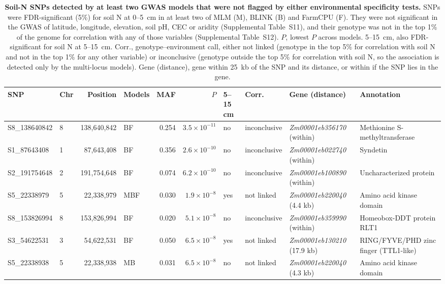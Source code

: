 \documentclass[namedate,unnumsec,webpdf,contemporary,large]{oup-authoring-template}
\begin{document}
\begin{table}[ht]
  \centering
  \scriptsize
  \caption{\textbf{Soil-N SNPs detected by at least two GWAS models that were not flagged by either environmental specificity tests.} SNPs were FDR-significant (5\%) for soil N at 0--5~cm in at least two of MLM (M), BLINK (B) and FarmCPU (F). They were not significant in the GWAS of latitude, longitude, elevation, soil pH, CEC or aridity (Supplemental Table~S11), and their genotype was not in the top 1\% of the genome for correlation with any of those variables (Supplemental Table~S12). $P$, lowest $P$ across models. 5--15~cm, also FDR-significant for soil N at 5--15~cm. Corr., genotype--environment call, either not linked (genotype in the top 5\% for correlation with soil N and not in the top 1\% for any other variable) or inconclusive (genotype outside the top 5\% for correlation with soil N, so the association is detected only by the multi-locus models). Gene (distance), gene within 25~kb of the SNP and its distance, or within if the SNP lies in the gene.}
  \label{tab:soilN_specific}
  \begin{tabular}{llrlrrllll}
  \hline
  SNP & Chr & Position & Models & MAF & $P$ & 5--15 cm & Corr. & Gene (distance) & Annotation \\
  \hline
  S8\_138640842 & 8 & 138,640,842 & BF  & 0.254 & $3.5\times10^{-11}$ & no  & inconclusive & \textit{Zm00001eb356170} (within) & Methionine S-methyltransferase \\
  S1\_87643408  & 1 &  87,643,408 & BF  & 0.356 & $2.6\times10^{-10}$ & no  & inconclusive & \textit{Zm00001eb022740} (within) & Syndetin \\
  S2\_191754648 & 2 & 191,754,648 & BF  & 0.074 & $6.2\times10^{-10}$ & no  & inconclusive & \textit{Zm00001eb100890} (within) & Uncharacterized protein \\
  S5\_22338979  & 5 &  22,338,979 & MBF & 0.030 & $1.9\times10^{-8}$  & yes & not linked   & \textit{Zm00001eb220040} (4.4 kb) & Amino acid kinase domain \\
  S8\_153826994 & 8 & 153,826,994 & BF  & 0.020 & $5.1\times10^{-8}$  & no  & inconclusive & \textit{Zm00001eb359990} (within) & Homeobox-DDT protein RLT1 \\
  S3\_54622531  & 3 &  54,622,531 & BF  & 0.050 & $6.5\times10^{-8}$  & yes & not linked   & \textit{Zm00001eb130210} (17.9 kb) & RING/FYVE/PHD zinc finger (TTL1-like) \\
  S5\_22338938  & 5 &  22,338,938 & MB  & 0.031 & $6.5\times10^{-8}$  & no  & not linked   & \textit{Zm00001eb220040} (4.3 kb) & Amino acid kinase domain \\

\end{tabular}
\end{table}
\end{document}
